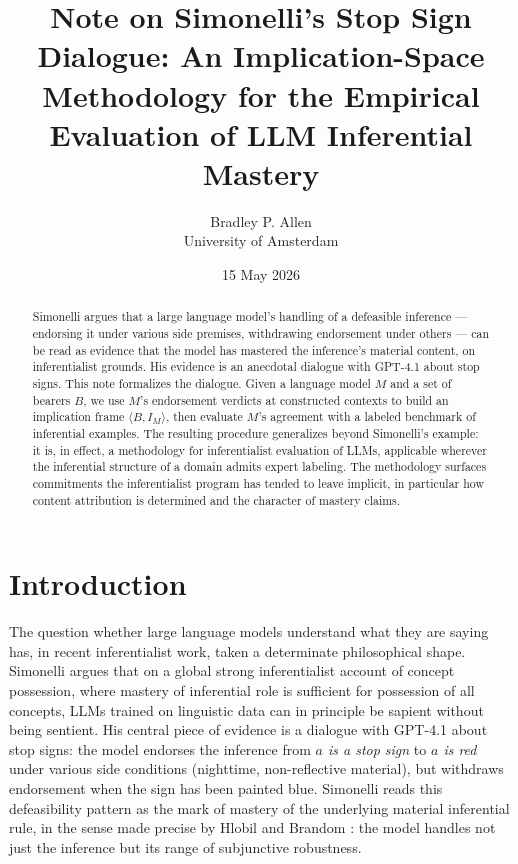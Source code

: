 \documentclass[11pt]{article}
\title{Note on Simonelli's Stop Sign Dialogue: An Implication-Space Methodology for the Empirical Evaluation of LLM Inferential Mastery}
\author{Bradley P. Allen \\ University of Amsterdam}
\date{15 May 2026}
\begin{document}
\maketitle

\begin{abstract}
Simonelli \cite{simonelli2026} argues that a large language model's handling of a defeasible inference --- endorsing it under various side premises, withdrawing endorsement under others --- can be read as evidence that the model has mastered the inference's material content, on inferentialist grounds. His evidence is an anecdotal dialogue with GPT-4.1 about stop signs. This note formalizes the dialogue. Given a language model $M$ and a set of bearers $B$, we use $M$'s endorsement verdicts at constructed contexts to build an implication frame $\langle B, I_M \rangle$, then evaluate $M$'s agreement with a labeled benchmark of inferential examples. The resulting procedure generalizes beyond Simonelli's example: it is, in effect, a methodology for inferentialist evaluation of LLMs, applicable wherever the inferential structure of a domain admits expert labeling. The methodology surfaces commitments the inferentialist program has tended to leave implicit, in particular how content attribution is determined and the character of mastery claims.
\end{abstract}

\section{Introduction}

The question whether large language models understand what they are saying has, in recent inferentialist work, taken a determinate philosophical shape. Simonelli \cite{simonelli2026} argues that on a global strong inferentialist account of concept possession, where mastery of inferential role is sufficient for possession of all concepts, LLMs trained on linguistic data can in principle be sapient without being sentient. His central piece of evidence is a dialogue with GPT-4.1 about stop signs: the model endorses the inference from \emph{$a$ is a stop sign} to \emph{$a$ is red} under various side conditions (nighttime, non-reflective material), but withdraws endorsement when the sign has been painted blue. Simonelli reads this defeasibility pattern as the mark of mastery of the underlying material inferential rule, in the sense made precise by Hlobil and Brandom \cite{hlobil2025}: the model handles not just the inference but its range of subjunctive robustness.
\end{document}
